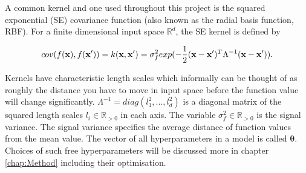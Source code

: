 \documentclass[12pt,a4paper]{report}
\theoremstyle{definition}
\begin{document}
A common kernel and one used throughout this project is the squared exponential (SE) covariance function (also known as the radial basis function, RBF). 
For a finite dimensional input space $\mathbb{R}^d$, the SE kernel is defined by

\begin{equation}
	\centering
	cov(f(\textbf{x}), f(\textbf{x}')) = k(\textbf{x}, \textbf{x}') = \sigma_{f}^2 exp(-\frac{1}{2} (\textbf{x} - \textbf{x}')^T \Lambda^{-1} (\textbf{x} - \textbf{x}')).
	\label{eq:SquaredExponentialKernel}
\end{equation}

Kernels have characteristic length scales which informally can be thought of as roughly the distance you have to move in input space before the function value will change significantly. 
$\Lambda^{-1}  = diag(l_{1}^2, ... , l_{d}^2)$ is a diagonal matrix of the squared length scales $l_{i} \in \mathbb{R}_{>0}$ in each axis.
The variable $\sigma_{f}^2 \in \mathbb{R}_{>0}$ is the signal variance.
The signal variance specifies the average distance of function values from the mean value.
The vector of all hyperparameters in a model is called $\boldsymbol{\theta}$.
Choices of such free hyperparameters will be discussed more in chapter \ref{chap:Method} including their optimisation. 
\end{document}
